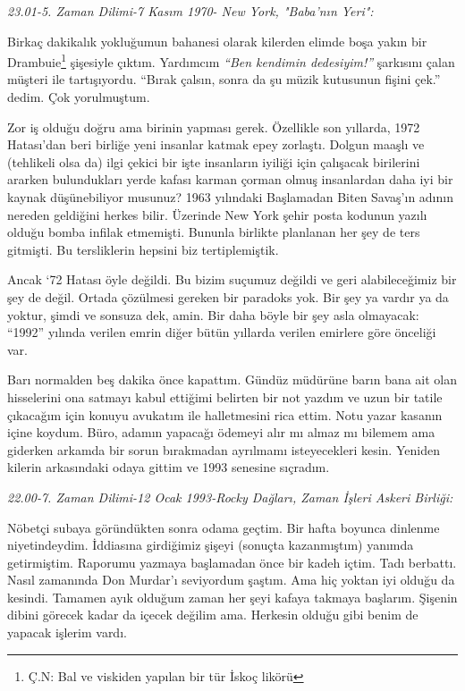 \noindent\emph{23.01-5. Zaman Dilimi-7 Kasım 1970- New York, "Baba'nın Yeri":}

Birkaç dakikalık yokluğumun bahanesi olarak kilerden elimde boşa yakın bir
Drambuie\footnote{Ç.N: Bal ve viskiden yapılan bir tür İskoç likörü} şişesiyle
çıktım. Yardımcım \emph{``Ben kendimin dedesiyim!''} şarkısını çalan müşteri ile
tartışıyordu. ``Bırak çalsın, sonra da şu müzik kutusunun fişini çek.'' dedim.
Çok yorulmuştum.

Zor iş olduğu doğru ama birinin yapması gerek. Özellikle son yıllarda, 1972
Hatası'dan beri birliğe yeni insanlar katmak epey zorlaştı. Dolgun maaşlı ve
(tehlikeli olsa da) ilgi çekici bir işte insanların iyiliği için çalışacak
birilerini ararken bulundukları yerde kafası karman çorman olmuş insanlardan
daha iyi bir kaynak düşünebiliyor musunuz? 1963 yılındaki Başlamadan Biten
Savaş'ın adının nereden geldiğini herkes bilir. Üzerinde New York şehir posta
kodunun yazılı olduğu bomba infilak etmemişti. Bununla birlikte planlanan her
şey de ters gitmişti. Bu tersliklerin hepsini biz tertiplemiştik.

Ancak `72 Hatası öyle değildi. Bu bizim suçumuz değildi ve geri alabileceğimiz
bir şey de değil. Ortada çözülmesi gereken bir paradoks yok. Bir şey ya vardır
ya da yoktur, şimdi ve sonsuza dek, amin. Bir daha böyle bir şey asla
olmayacak: ``1992'' yılında verilen emrin diğer bütün yıllarda verilen emirlere
göre önceliği var.

Barı normalden beş dakika önce kapattım. Gündüz müdürüne barın bana ait olan
hisselerini ona satmayı kabul ettiğimi belirten bir not yazdım ve uzun bir
tatile çıkacağım için konuyu avukatım ile halletmesini rica ettim. Notu yazar
kasanın içine koydum. Büro, adamın yapacağı ödemeyi alır mı almaz mı bilemem
ama giderken arkamda bir sorun bırakmadan ayrılmamı isteyecekleri kesin.
Yeniden kilerin arkasındaki odaya gittim ve 1993 senesine sıçradım.

\noindent\emph{22.00-7. Zaman Dilimi-12 Ocak 1993-Rocky Dağları, Zaman İşleri Askeri Birliği:}

Nöbetçi subaya göründükten sonra odama geçtim. Bir hafta boyunca dinlenme
niyetindeydim. İddiasına girdiğimiz şişeyi (sonuçta kazanmıştım) yanımda
getirmiştim. Raporumu yazmaya başlamadan önce bir kadeh içtim. Tadı berbattı.
Nasıl zamanında Don Murdar'ı seviyordum şaştım. Ama hiç yoktan iyi olduğu da
kesindi. Tamamen ayık olduğum zaman her şeyi kafaya takmaya başlarım.  Şişenin
dibini görecek kadar da içecek değilim ama. Herkesin olduğu gibi benim de
yapacak işlerim vardı.

